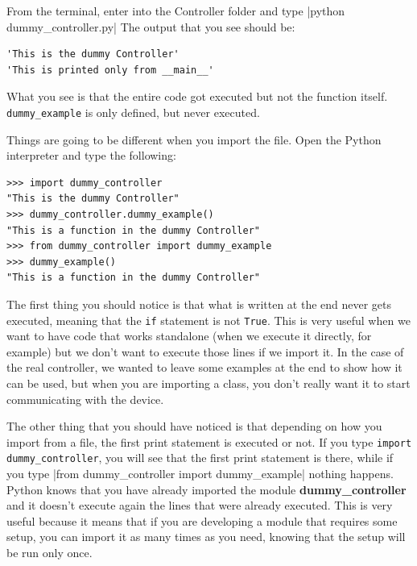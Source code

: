 From the terminal, enter into the Controller folder and type |python dummy_controller.py| The output that you see should be:

\begin{verbatim}
'This is the dummy Controller'
'This is printed only from __main__'
\end{verbatim}

What you see is that the entire code got executed but not the function itself. \texttt{dummy_example} is only defined, but never executed.


Things are going to be different when you import the file. Open the Python interpreter and type the following:

\begin{verbatim}
>>> import dummy_controller
"This is the dummy Controller"
>>> dummy_controller.dummy_example()
"This is a function in the dummy Controller"
>>> from dummy_controller import dummy_example
>>> dummy_example()
"This is a function in the dummy Controller"
\end{verbatim}

The first thing you should notice is that what is written at the end never gets executed, meaning that the \texttt{if} statement is not
\texttt{True}. This is very useful when we want to have code that works standalone (when we execute it directly, for example) but we don't want to execute those lines if we import it. In the case of the real controller, we wanted to leave some examples at the end to show how it can be used, but when you are importing a class, you don't really want it to start communicating with the device.

The other thing that you should have noticed is that depending on how you import from a file, the first print statement is executed or not. If
you type \texttt{import dummy_controller}, you will see that the first print statement is there, while if you type |from dummy_controller import dummy_example| nothing happens. Python knows that you have already imported the module \textbf{dummy\_controller} and it doesn't execute again the lines that were already executed. This is very useful because it means that if you are developing a module that requires some setup, you can import it as many times as you need, knowing that the setup will be run only once. 

